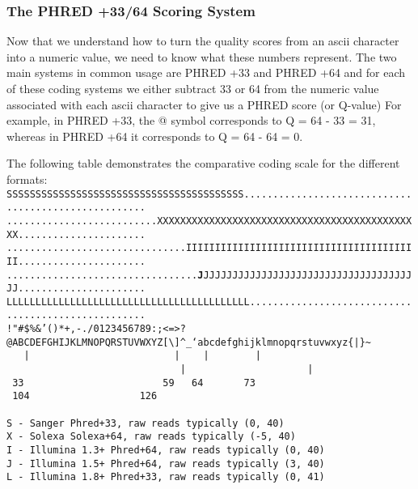 \subsubsection{The PHRED +33/64 Scoring System}
\begin{information}
Now that we understand how to turn the quality scores from an ascii character into a numeric value, we need to know what these numbers represent.
The two main systems in common usage are PHRED +33 and PHRED +64 and for each of these coding systems we either subtract 33 or 64 from the numeric value associated with each ascii character to give us a PHRED score (or Q-value)
For example, in PHRED +33, the @ symbol corresponds to Q = 64 - 33 = 31, whereas in PHRED +64 it corresponds to Q = 64 - 64 = 0. \\
\end{information}

The following table demonstrates the comparative coding scale for the different formats: \\

\scriptsize
\texttt{SSSSSSSSSSSSSSSSSSSSSSSSSSSSSSSSSSSSSSSSS..................................................... \\
..........................XXXXXXXXXXXXXXXXXXXXXXXXXXXXXXXXXXXXXXXXXXXXXX...................... \\
...............................IIIIIIIIIIIIIIIIIIIIIIIIIIIIIIIIIIIIIIIII...................... \\
.................................\textbf{J}JJJJJJJJJJJJJJJJJJJJJJJJJJJJJJJJJJJJJJ...................... \\
LLLLLLLLLLLLLLLLLLLLLLLLLLLLLLLLLLLLLLLLLL.................................................... \\
!"\#\$\%\&'()*+,-./0123456789:;\textless =\textgreater?@ABCDEFGHIJKLMNOPQRSTUVWXYZ[\textbackslash]\^{}_`abcdefghijklmnopqrstuvwxyz\{|\}\~{}} \\
\texttt{
~~|~~~~~~~~~~~~~~~~~~~~~~~~~|~~~~|~~~~~~~~|~~~~~~~~~~~~~~~~~~~~~~~~~~~~~~|~~~~~~~~~~~~~~~~~~~~~|~\\
~33~~~~~~~~~~~~~~~~~~~~~~~~59~~~64~~~~~~~73~~~~~~~~~~~~~~~~~~~~~~~~~~~~104~~~~~~~~~~~~~~~~~~~126~\\
~ \\
 S - Sanger        Phred+33,  raw reads typically (0, 40) \\
 X - Solexa        Solexa+64, raw reads typically (-5, 40) \\
 I - Illumina 1.3+ Phred+64,  raw reads typically (0, 40) \\ 
 J - Illumina 1.5+ Phred+64,  raw reads typically (3, 40) \\
 L - Illumina 1.8+ Phred+33,  raw reads typically (0, 41) \\
}
\normalsize

